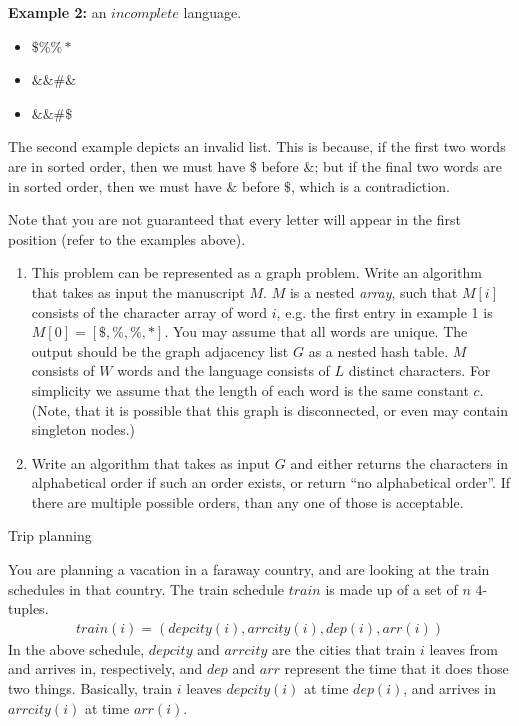 \documentclass[11pt]{article}
\begin{document}
\textbf{Example 2:} an  $\mathit{incomplete}$ language.
\begin{itemize}
    \item $\$\%\%*$
    \item $\&\&\#\&$
    \item $\&\&\#\$$
\end{itemize}
The second example depicts an invalid list. This is because, if the first two words are in sorted order, then we must have $\$$ before $\&$; but if the final two words are in sorted order, then we must have $\&$ before $\$$, which is a contradiction. 

Note that you are not guaranteed that every letter will appear in the first position (refer to the examples above).\\

\begin{enumerate}
    \item This problem can be represented as a graph problem.  Write an algorithm that takes as input the manuscript $M$.  $M$ is a  nested \emph{array}, such that $M[i]$ consists of the character array of word $i$, e.g.  the first entry in example 1 is $M[0] = [\$,\%,\%,*]$. You may assume that all words are unique.  The output should be the graph adjacency list $G$ as a nested hash table.  $M$ consists of $W$ words and the language consists of $L$ distinct characters. For simplicity we assume that the length of each word is the same constant $c$. (Note, that it is possible that this graph is disconnected, or even may contain singleton nodes.)\\
    \item Write an algorithm that takes as input $G$ and either returns  the characters in alphabetical order if such an order exists, or return ``no alphabetical order''. If there are multiple possible orders, than any one of those is acceptable.

\end{enumerate}




\begin{problem}
Trip planning
\end{problem}

You are planning a vacation in a faraway country, and are looking at the train schedules in that country. 
The train schedule $train$ is made up of a set of $n$ $4$-tuples.
\begin{align*}
    train(i)=(depcity(i),arrcity(i),dep(i),arr(i))
\end{align*}
In the above schedule, $depcity$ and $arrcity$ are the cities that train $i$ leaves from and arrives in, 
respectively, and $dep$ and $arr$ represent the time that it does those two things. Basically, train $i$ 
leaves $depcity(i)$ at time $dep(i)$, and arrives in $arrcity(i)$ at time $arr(i)$.
\end{document}
